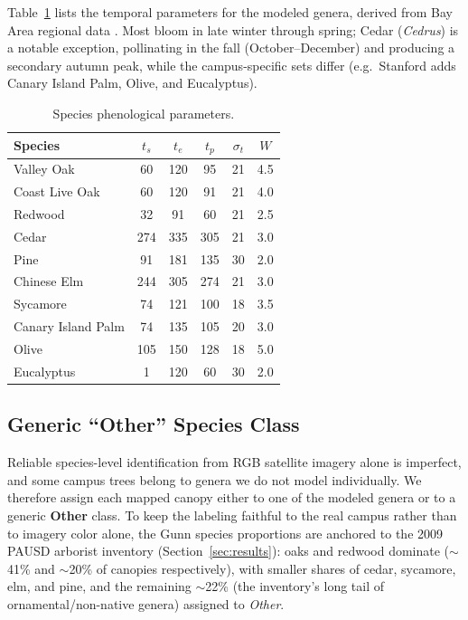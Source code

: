 \documentclass[11pt]{article}
\begin{document}
Table~\ref{tab:species} lists the temporal parameters for the modeled genera, derived from Bay Area regional data \citep{bastl2016}. Most bloom in late winter through spring; Cedar (\emph{Cedrus}) is a notable exception, pollinating in the fall (October--December) and producing a secondary autumn peak, while the campus-specific sets differ (e.g.\ Stanford adds Canary Island Palm, Olive, and Eucalyptus).

\begin{table}[h]
\centering
\caption{Species phenological parameters.}
\label{tab:species}
\begin{tabular}{@{}lccccc@{}}
\toprule
Species & $t_s$ & $t_e$ & $t_p$ & $\sigma_t$ & $W$ \\
\midrule
Valley Oak & 60 & 120 & 95 & 21 & 4.5 \\
Coast Live Oak & 60 & 120 & 91 & 21 & 4.0 \\
Redwood & 32 & 91 & 60 & 21 & 2.5 \\
Cedar & 274 & 335 & 305 & 21 & 3.0 \\
Pine & 91 & 181 & 135 & 30 & 2.0 \\
Chinese Elm & 244 & 305 & 274 & 21 & 3.0 \\
Sycamore & 74 & 121 & 100 & 18 & 3.5 \\
Canary Island Palm & 74 & 135 & 105 & 20 & 3.0 \\
Olive & 105 & 150 & 128 & 18 & 5.0 \\
Eucalyptus & 1 & 120 & 60 & 30 & 2.0 \\
\bottomrule
\end{tabular}
\end{table}

\subsection{Generic ``Other'' Species Class}
\label{sec:other}

Reliable species-level identification from RGB satellite imagery alone is imperfect, and some campus trees belong to genera we do not model individually. We therefore assign each mapped canopy either to one of the modeled genera or to a generic \textbf{Other} class. To keep the labeling faithful to the real campus rather than to imagery color alone, the Gunn species proportions are anchored to the 2009 PAUSD arborist inventory (Section~\ref{sec:results}): oaks and redwood dominate ($\sim$41\% and $\sim$20\% of canopies respectively), with smaller shares of cedar, sycamore, elm, and pine, and the remaining $\sim$22\% (the inventory's long tail of ornamental/non-native genera) assigned to \emph{Other}.
\end{document}
